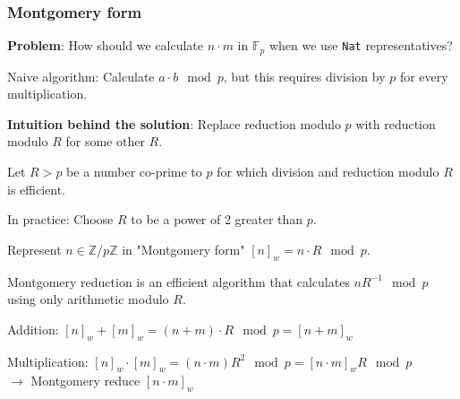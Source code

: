 \documentclass[options]{beamer}
\begin{document}
\begin{frame}[fragile]
    \frametitle{Montgomery form}

    {\bf Problem}: How should we calculate $n \cdot m$ in $\mathbb{F}_p$ when we use \verb+Nat+ representatives?

    Naive algorithm: Calculate $a \cdot b \mod p$, but this requires division by $p$ for every multiplication. 

    \pause
    \vspace{6pt}

    {\bf Intuition behind the solution}: Replace reduction modulo $p$ with reduction modulo $R$ for some other $R$.

    Let $R > p$ be a number co-prime to $p$ for which division and reduction modulo $R$ is efficient. 

    In practice: Choose $R$ to be a power of 2 greater than $p$.

    Represent $n \in \mathbb{Z} / p \mathbb{Z}$ in "Montgomery form" $[n]_w = n \cdot R \mod p$.

    Montgomery reduction is an efficient algorithm that calculates $n R^{-1} \mod p$ using only arithmetic modulo $R$.

    \vspace{6pt}
    \pause

    Addition: $[n]_w + [m]_w = (n + m) \cdot R \mod p = [n + m]_w$

    Multiplication: $[n]_w \cdot [m]_w = (n \cdot m) R^2 \mod p = [n \cdot m]_w R \mod p$ \\
    $\longrightarrow$ Montgomery reduce $[n \cdot m]_w$
\end{frame}
\end{document}
